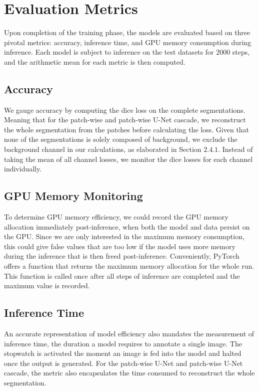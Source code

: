 \section{Evaluation Metrics}
Upon completion of the training phase, the models are evaluated based on three pivotal metrics: accuracy, inference time, and GPU memory consumption during inference.
Each model is subject to inference on the test datasets for $2000$ steps, and the arithmetic mean for each metric is then computed.

\subsection{Accuracy}
We gauge accuracy by computing the dice loss on the complete segmentations. Meaning that for the patch-wise and patch-wise U-Net cascade,
we reconstruct the whole segmentation from the patches before calculating the loss. Given that none of the segmentations is solely composed of background,
we exclude the background channel in our calculations, as elaborated in Section $2.4.1$. Instead of taking the mean of all channel losses, we monitor the dice losses for each channel individually.

\subsection{GPU Memory Monitoring}
To determine GPU memory efficiency, we could record the GPU memory allocation immediately post-inference, when both the model and data persist on the GPU.
Since we are only interested in the maximum memory consumption, this could give false values that are too low if the model uses more memory during the inference that is then freed post-inference.
Conveniently, PyTorch offers a function that returns the maximum memory allocation for the whole run. This function is called once after all steps of inference are completed and the maximum value is recorded.

\subsection{Inference Time}
An accurate representation of model efficiency also mandates the measurement of inference time, the duration a model requires to annotate a single image.
The stopwatch is activated the moment an image is fed into the model and halted once the output is generated. For the patch-wise U-Net and patch-wise U-Net cascade,
the metric also encapsulates the time consumed to reconstruct the whole segmentation.

